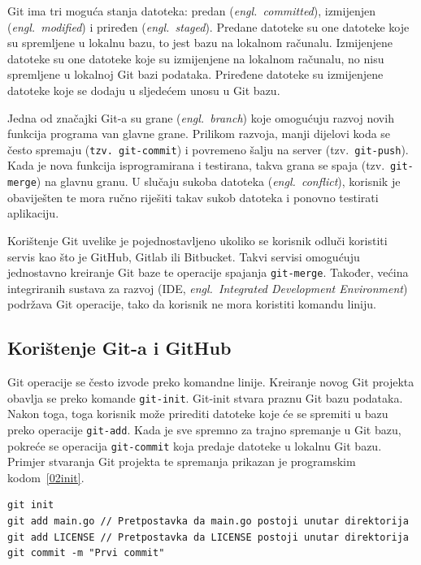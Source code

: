 Git ima tri moguća stanja datoteka: predan (\textit{engl.~committed}), izmijenjen
(\textit{engl.~modified}) i priređen (\textit{engl.~staged}). Predane datoteke su one datoteke koje
su spremljene u lokalnu bazu, to jest bazu na lokalnom računalu. Izmijenjene datoteke su one
datoteke koje su izmijenjene na lokalnom računalu, no nisu spremljene u lokalnoj Git bazi podataka.
Priređene datoteke su izmijenjene datoteke koje se dodaju u sljedećem unosu u Git bazu.

Jedna od značajki Git-a su grane (\textit{engl.~branch}) koje omogućuju razvoj novih funkcija
programa van glavne grane. Prilikom razvoja, manji dijelovi koda se često spremaju (\texttt{tzv.
git-commit}) i povremeno šalju na server (tzv.~\texttt{git-push}). Kada je nova funkcija
isprogramirana i testirana, takva grana se spaja (tzv.~\texttt{git-merge}) na glavnu granu. U
slučaju sukoba datoteka (\textit{engl.~conflict}), korisnik je obaviješten te mora ručno riješiti
takav sukob datoteka i ponovno testirati aplikaciju.

Korištenje Git uvelike je pojednostavljeno ukoliko se korisnik odluči koristiti servis kao što je
GitHub, Gitlab ili Bitbucket. Takvi servisi omogućuju jednostavno kreiranje Git baze te operacije
spajanja \texttt{git-merge}. Također, većina integriranih sustava za razvoj (IDE,
\textit{engl.~Integrated Development Environment}) podržava Git operacije, tako da korisnik ne mora
koristiti komandu liniju.

\subsection{Korištenje Git-a i GitHub} Git operacije se često izvode preko komandne linije.
Kreiranje novog Git projekta obavlja se preko komande \texttt{git-init}. Git-init stvara praznu Git
bazu podataka. Nakon toga, toga korisnik može prirediti datoteke koje će se spremiti u bazu preko
operacije \texttt{git-add}. Kada je sve spremno za trajno spremanje u Git bazu, pokreće se operacija
\texttt{git-commit} koja predaje datoteke u lokalnu Git bazu. Primjer stvaranja Git projekta te
spremanja prikazan je programskim kodom~\ref{02init}.

\begin{lstlisting}[float=h]
git init
git add main.go // Pretpostavka da main.go postoji unutar direktorija
git add LICENSE // Pretpostavka da LICENSE postoji unutar direktorija
git commit -m "Prvi commit"
\end{lstlisting}

